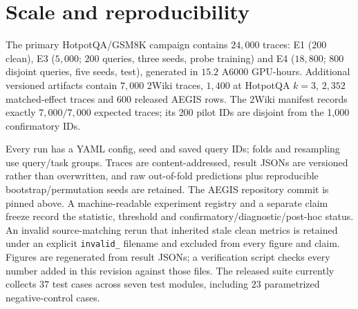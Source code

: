 \documentclass{article}
\begin{document}
\clearpage
\section{Scale and reproducibility}
\label{app:scale}

The primary HotpotQA/GSM8K campaign contains $24{,}000$ traces: E1 ($200$ clean), E3
($5{,}000$; $200$ queries, three seeds, probe training) and E4 ($18{,}800$; $800$ disjoint
queries, five seeds, test), generated in $15.2$ A6000 GPU-hours. Additional versioned artifacts
contain $7{,}000$ 2Wiki traces, $1{,}400$ at HotpotQA $k{=}3$, $2{,}352$ matched-effect traces
and $600$ released AEGIS rows. The 2Wiki manifest records exactly $7{,}000/7{,}000$ expected
traces; its 200 pilot IDs are disjoint from the 1,000 confirmatory IDs.

Every run has a YAML config, seed and saved query IDs; folds and resampling use query/task
groups. Traces are content-addressed, result JSONs are versioned rather than overwritten, and
raw out-of-fold predictions plus reproducible bootstrap/permutation seeds are retained. The
AEGIS repository commit is pinned above. A machine-readable experiment registry and a separate
claim freeze record the statistic, threshold and confirmatory/diagnostic/post-hoc status. An
invalid source-matching rerun that inherited stale clean metrics is retained under an explicit
\texttt{invalid\_} filename and excluded from every figure and claim. Figures are regenerated
from result JSONs; a verification script checks every number added in this revision against
those files. The released suite currently collects $37$ test cases across seven test modules,
including $23$ parametrized negative-control cases.
\end{document}
